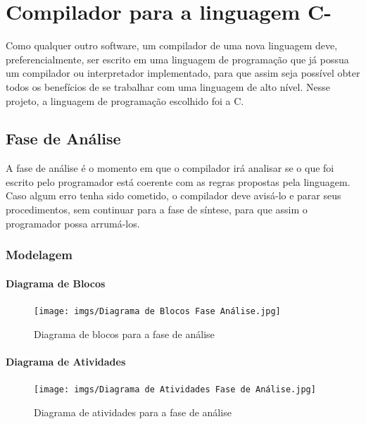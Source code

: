 \documentclass[
	12pt,				%
	oneside,
	a4paper,			%
	english,			%
	french,				%
	spanish,			%
	brazil,				%
	]{abntex2}
\begin{document}
\chapter{Compilador para a linguagem C-}

Como qualquer outro software, um compilador de uma nova linguagem deve, preferencialmente, ser escrito em uma linguagem de programação que já possua um compilador ou interpretador implementado, para que assim seja possível obter todos os benefícios de se trabalhar com uma linguagem de alto nível. Nesse projeto, a linguagem de programação escolhido foi a C.

\section{Fase de Análise}

A fase de análise é o momento em que o compilador irá analisar se o que foi escrito pelo programador está coerente com as regras propostas pela linguagem. Caso algum erro tenha sido cometido, o compilador deve avisá-lo e parar seus procedimentos, sem continuar para a fase de síntese, para que assim o programador possa arrumá-los.

\subsection{Modelagem}

\subsubsection{Diagrama de Blocos}

\begin{figure}[H]
\centering 
\caption{Diagrama de blocos para a fase de análise} \label{fig:DiagramaBlocosAnalise}
\graphicspath{ {./imgs/} } 
\texttt{[image: imgs/Diagrama de Blocos Fase Análise.jpg]}
\end{figure}

\subsubsection{Diagrama de Atividades}

\begin{figure}[H]
\centering 
\caption{Diagrama de atividades para a fase de análise} \label{fig:DiagramaAtividadesAnalise}
\graphicspath{ {./imgs/} } 
\texttt{[image: imgs/Diagrama de Atividades Fase de Análise.jpg]}
\end{figure}
\end{document}
